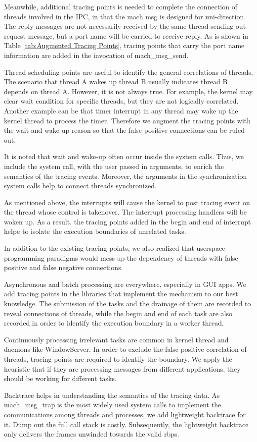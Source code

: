 Meanwhile, additional tracing points is needed to complete the connection of threads involved in the IPC,
in that the mach msg is designed for uni-direction.
The reply messages are not necessarily received by the same thread sending out request message, but a port name will be carried to receive reply.
As is shown in Table \ref{tab:Augmented Tracing Points}, tracing points that carry the port name information are added in the invocation of mach\_msg\_send.\par
Thread scheduling points are useful to identify the general correlations of threads.
The scenario that thread A wakes up thread B usually indicates thread B depends on thread A.
However, it is not always true.
For example, the kernel may clear wait condition for specific threads, but they are not logically correlated.
Another example can be that timer interrupt in any thread may wake up the kernel thread to process the timer.
Therefore we augment the tracing points with the wait and wake up reason so that the false positive connections can be ruled out.\par
It is noted that wait and wake-up often occur inside the system calls.
Thus, we include the system call, with the user passed in arguments, to enrich the semantics of the tracing events.
Moreover, the arguments in the synchronization system calls help to connect threads synchronized.\par
As mentioned above, the interrupts will cause the kernel to post tracing event on the thread whose control is takenover.
The interrupt processing handlers will be woken up.
As a result, the tracing points added in the begin and end of interrupt helpe to isolate the execution boundaries of unrelated tasks.\par
In addition to the existing tracing points, we also realized that userspace programming paradigms would mess up the dependency of threads with false positive and false negative connections.\par
Asynchronous and batch processing are everywhere, especially in GUI apps.
We add tracing points in the libraries that implement the mechanism to our best knowledge.
The submission of the tasks and the drainage of them are recorded to reveal connections of threads,
while the begin and end of each task are also recorded in order to identify the execution boundary in a worker thread.\par
Continuously processing irrelevant tasks are common in kernel thread and daemons like WindowServer.
In order to exclude the false positive correlation of threads, tracing points are required to identify the boundary.
We apply the heuristic that if they are processing messages from different applications, they should be working for different tasks. \par
Backtrace helps in understanding the semantics of the tracing data.
As mach\_msg\_trap is the most widely used system calls to implement the communications among threads and processes, we add lightweight backtrace for it.
Dump out the full call stack is costly.
Subsequently, the lightweight backtrace only delivers the frames unwinded towards the valid rbps.\par
